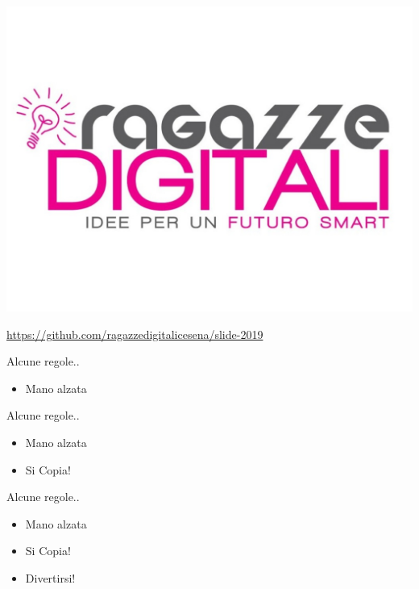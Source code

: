 
{\includegraphics[width=\paperwidth,height=\paperheight]{images/ragazze_digitali.jpg}}
\begin{frame}
\mbox{}
\vspace{70.0mm}
\begin{center}
\href{https://github.com/ragazzedigitalicesena/slide-2019}{https://github.com/ragazzedigitalicesena/slide-2019}    
\end{center}

\end{frame}


\begin{frame}{Alcune regole..}
	\begin{itemize}
	    \item Mano alzata
    \end{itemize}
\end{frame}

\begin{frame}{Alcune regole..}
	\begin{itemize}
	    \item Mano alzata
        \item Si Copia!
    \end{itemize}
\end{frame}

\begin{frame}{Alcune regole..}
	\begin{itemize}
	    \item Mano alzata
        \item Si Copia!
        \item Divertirsi!
    \end{itemize}
\end{frame}

